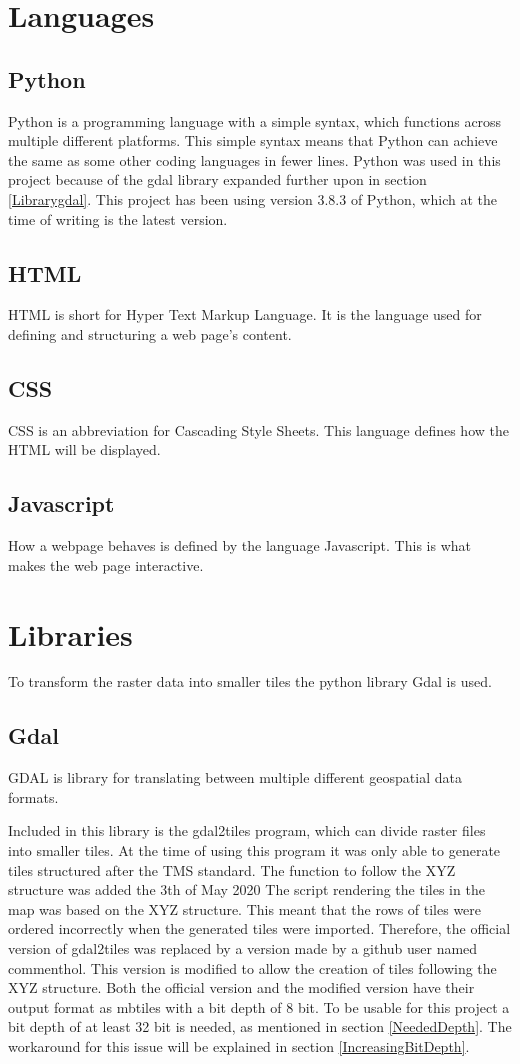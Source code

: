 \section{Languages}
\subsection*{Python}
Python is a programming language with a simple syntax, which functions across multiple different platforms. This simple syntax means that Python can achieve the same as some other coding languages in fewer lines.\citep{WhatIsPython}
Python was used in this project because of the gdal library expanded further upon in section \ref{Librarygdal}.
This project has been using version 3.8.3 of Python, which at the time of writing is the latest version. \citep{PythonVersion}
\subsection*{HTML}
HTML is short for Hyper Text Markup Language. It is the language used for defining and structuring a web page’s content.
\subsection*{CSS}
CSS is an abbreviation for Cascading Style Sheets. This language defines how the HTML will be displayed.
\subsection*{Javascript}
How a webpage behaves is defined by the language Javascript.  This is what makes the web page interactive. 
\citep{WhatIsJs}

\section{Libraries}
To transform the raster data into smaller tiles the python library Gdal is used. 
\subsection*{Gdal}\label{Librarygdal}
GDAL is library for translating between multiple different geospatial data formats. \citep{GDAL} 

Included in this library is the gdal2tiles program, which can divide raster files into smaller tiles. 
At the time of using this program it was only able to generate tiles structured after the TMS standard. The function to follow the XYZ structure was added the 3th of May 2020 \citep{gdal2tilesDoc} \citep{GdalRelease}
%
The script rendering the tiles in the map was based on the XYZ structure. This meant that the rows of tiles were ordered incorrectly when the generated tiles were imported. Therefore, the official version of gdal2tiles was replaced by a version made by a github user named commenthol. This version is modified to allow the creation of tiles following the XYZ structure. \citep{gdalLeaflet}
Both the official version and the modified version have their output format as mbtiles with a bit depth of 8 bit. To be usable for this project a bit depth of at least 32 bit is needed, as mentioned in section \ref{NeededDepth}. The workaround for this issue will be explained in section \ref{IncreasingBitDepth}. 
